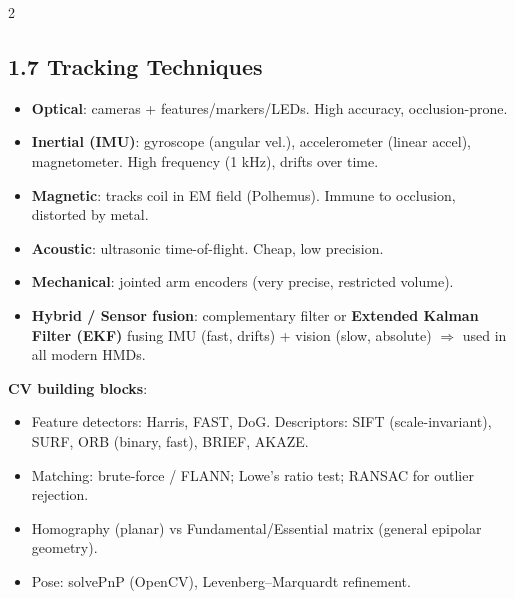 \begin{paracol}{2}
\switchcolumn*

\subsection*{1.7 Tracking Techniques}
\begin{itemize}[leftmargin=*,nosep]
  \item \textbf{Optical}: cameras + features/markers/LEDs. High accuracy, occlusion-prone.
  \item \textbf{Inertial (IMU)}: gyroscope (angular vel.), accelerometer (linear accel), magnetometer. High frequency (1 kHz), drifts over time.
  \item \textbf{Magnetic}: tracks coil in EM field (Polhemus). Immune to occlusion, distorted by metal.
  \item \textbf{Acoustic}: ultrasonic time-of-flight. Cheap, low precision.
  \item \textbf{Mechanical}: jointed arm encoders (very precise, restricted volume).
  \item \textbf{Hybrid / Sensor fusion}: complementary filter or \textbf{Extended Kalman Filter (EKF)} fusing IMU (fast, drifts) + vision (slow, absolute) $\Rightarrow$ used in all modern HMDs.
\end{itemize}
\textbf{CV building blocks}:
\begin{itemize}[leftmargin=*,nosep]
  \item Feature detectors: Harris, FAST, DoG. Descriptors: SIFT (scale-invariant), SURF, ORB (binary, fast), BRIEF, AKAZE.
  \item Matching: brute-force / FLANN; Lowe's ratio test; RANSAC for outlier rejection.
  \item Homography (planar) vs Fundamental/Essential matrix (general epipolar geometry).
  \item Pose: solvePnP (OpenCV), Levenberg–Marquardt refinement.
\end{itemize}

\switchcolumn


\end{paracol}

